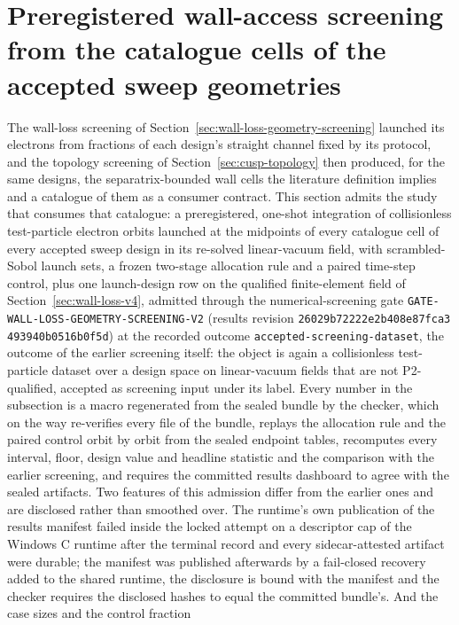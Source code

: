 \documentclass[11pt]{article}
\newcommand{\GeometryScreeningTwoEvidenceRevision}{\texttt{26029b72\allowbreak{}222e2b40\allowbreak{}8e87fca3\allowbreak{}%
493940b0\allowbreak{}516b0f5d}}
\begin{document}
\section{Preregistered wall-access screening from the catalogue cells of the accepted sweep geometries}
\label{sec:wall-loss-geometry-screening-v2}

The wall-loss screening of Section~\ref{sec:wall-loss-geometry-screening} launched
its electrons from fractions of each design's straight channel fixed by its
protocol, and the topology screening of Section~\ref{sec:cusp-topology} then
produced, for the same designs, the separatrix-bounded wall cells the literature
definition implies and a catalogue of them as a consumer contract. This section
admits the study that consumes that catalogue: a preregistered, one-shot
integration of collisionless test-particle electron orbits launched at the
midpoints of every catalogue cell of every accepted sweep design in its re-solved
linear-vacuum field, with scrambled-Sobol launch sets, a frozen two-stage
allocation rule and a paired time-step control, plus one launch-design row on the
qualified finite-element field of Section~\ref{sec:wall-loss-v4}, admitted through
the numerical-screening gate \texttt{GATE-WALL-LOSS-GEOMETRY-SCREENING-V2} (results
revision \GeometryScreeningTwoEvidenceRevision) at the recorded outcome
\texttt{accepted-screening-dataset}, the outcome of the earlier screening itself:
the object is again a collisionless test-particle dataset over a design space on
linear-vacuum fields that are not P2-qualified, accepted as screening input under
its label. Every number in the subsection is a macro regenerated from the sealed
bundle by the checker, which on the way re-verifies every file of the bundle,
replays the allocation rule and the paired control orbit by orbit from the sealed
endpoint tables, recomputes every interval, floor, design value and headline
statistic and the comparison with the earlier screening, and requires the committed
results dashboard to agree with the sealed artifacts. Two features of this
admission differ from the earlier ones and are disclosed rather than smoothed
over. The runtime's own publication of the results manifest failed inside the
locked attempt on a descriptor cap of the Windows C runtime after the terminal
record and every sidecar-attested artifact were durable; the manifest was
published afterwards by a fail-closed recovery added to the shared runtime, the
disclosure is bound with the manifest and the checker requires the disclosed
hashes to equal the committed bundle's. And the case sizes and the control fraction
\end{document}
